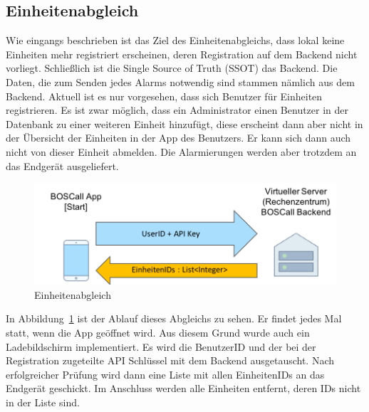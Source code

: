 \subsection{Einheitenabgleich}
Wie eingangs beschrieben ist das Ziel des Einheitenabgleichs, dass lokal keine Einheiten mehr registriert erscheinen, deren Registration auf dem Backend nicht vorliegt. Schließlich ist die Single Source of Truth (SSOT) das Backend. Die Daten, die zum Senden jedes Alarms notwendig sind stammen nämlich aus dem Backend. Aktuell ist es nur vorgesehen, dass sich Benutzer für Einheiten registrieren. Es ist zwar möglich, dass ein Administrator einen Benutzer in der Datenbank zu einer weiteren Einheit hinzufügt, diese erscheint dann aber nicht in der Übersicht der Einheiten in der App des Benutzers. Er kann sich dann auch nicht von dieser Einheit abmelden. Die Alarmierungen werden aber trotzdem an das Endgerät ausgeliefert.

\begin{figure}[H]
	\centering
	\includegraphics[width=\linewidth]{include/img/einheitenabgleich}
	\caption{Einheitenabgleich}
	\label{fig:einheitenabgleich}
\end{figure}

In Abbildung~\ref{fig:einheitenabgleich} ist der Ablauf dieses Abgleichs zu sehen. Er findet jedes Mal statt, wenn die App geöffnet wird. Aus diesem Grund wurde auch ein Ladebildschirm implementiert. Es wird die BenutzerID und der bei der Registration zugeteilte API Schlüssel mit dem Backend ausgetauscht. Nach erfolgreicher Prüfung wird dann eine Liste mit allen EinheitenIDs an das Endgerät geschickt. Im Anschluss werden alle Einheiten entfernt, deren IDs nicht in der Liste sind.

